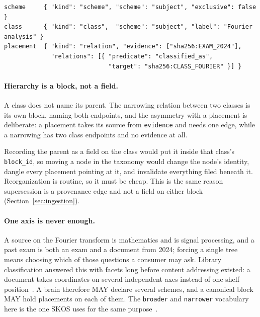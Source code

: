 \documentclass[11pt,a4paper]{article}
\begin{document}
\begin{verbatim}
scheme     { "kind": "scheme", "scheme": "subject", "exclusive": false }
class      { "kind": "class",  "scheme": "subject", "label": "Fourier analysis" }
placement  { "kind": "relation", "evidence": ["sha256:EXAM_2024"],
             "relations": [{ "predicate": "classified_as",
                             "target": "sha256:CLASS_FOURIER" }] }
\end{verbatim}

\paragraph{Hierarchy is a block, not a field.}
A class does not name its parent. The narrowing relation between two classes is
its own block, naming both endpoints, and the asymmetry with a placement is
deliberate: a placement takes its source from \texttt{evidence} and needs one
edge, while a narrowing has two class endpoints and no evidence at all.

Recording the parent as a field on the class would put it inside that class's
\texttt{block\_id}, so moving a node in the taxonomy would change the node's
identity, dangle every placement pointing at it, and invalidate everything
filed beneath it. Reorganization is routine, so it must be cheap. This is the same reason
supersession is a provenance edge and not a field on either block
(Section~\ref{sec:ingestion}).

\paragraph{One axis is never enough.}
A source on the Fourier transform is mathematics and is signal processing, and
a past exam is both an exam and a document from 2024; forcing a single tree
means choosing which of those questions a consumer may ask. Library
classification answered this with facets long before content addressing
existed: a document takes coordinates on several independent axes instead of
one shelf position~\cite{ranganathan1967prolegomena}. A brain
therefore MAY declare several schemes, and a canonical block MAY hold placements
on each of them. The \texttt{broader} and \texttt{narrower} vocabulary here is
the one SKOS uses for the same purpose~\cite{skos2009}.
\end{document}
